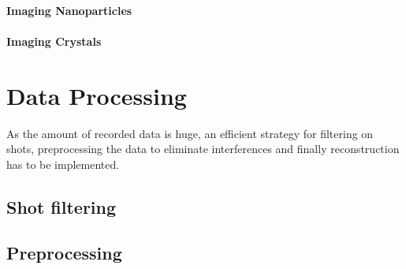 \paragraph{Imaging Nanoparticles}
\paragraph{Imaging Crystals}

\section{Data Processing}
As the amount of recorded data is huge, an efficient strategy for filtering on shots, preprocessing the data to eliminate interferences and finally reconstruction has to be implemented.
\subsection{Shot filtering}
\subsection{Preprocessing}



